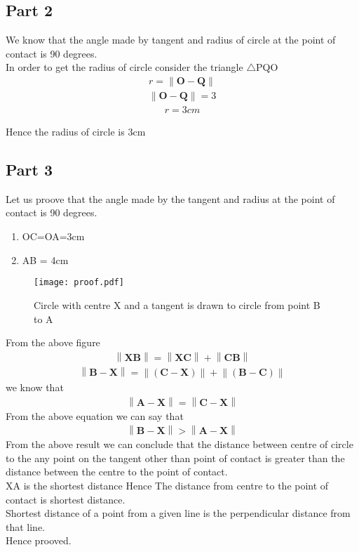 \documentclass[journal,10pt,twocolumn]{article}
\providecommand{\norm}[1]{\left\lVert#1\right\rVert}
\let\vec\mathbf
\begin{document}
\subsection*{Part 2}
We know that the angle made by tangent and radius of circle at the point of contact is 90 degrees. \\
In order to get the radius of circle consider the triangle $\triangle$PQO \\
\begin{align}
	r = \norm{\vec{O}-\vec{Q}}
\end{align}
\begin{align}
	\norm{\vec{O} - \vec{Q}}= 3
\end{align}
\begin{align}
  r= 3 cm 
\end{align}


Hence the radius of circle is 3cm

\subsection*{Part 3}
Let us proove that the angle made by the tangent and radius at the point of contact is 90  degrees. \\
\begin{enumerate}
	\item OC=OA=3cm
	\item AB = 4cm
\end{enumerate}
\begin{figure}[h]
\centering
\texttt{[image: proof.pdf]}
\caption{Circle with centre X and a tangent is drawn to circle from point B to A}
\label{fig:Circle}
\end{figure}
From the above figure 
\begin{align}
	\norm{\vec{XB}} = \norm{\vec{XC}} + \norm{\vec{CB}}
\end{align}
\begin{align}
	\norm{\vec{B-X}} = \norm{(\vec{C-X})} + \norm{(\vec{B-C})}
\end{align}
we know that \\
\begin{align}
	\norm{\vec{A-X}} = \norm{\vec{C-X}}
\end{align}
From the above equation we can say that 
\begin{align}
	\norm{\vec{B-X}} > \norm{\vec{A-X}}
\end{align}
From the above result we can conclude that the distance between centre of circle to the any point on the tangent other than point of contact is greater than the distance between the centre to the point of contact. \\
XA is the shortest distance
Hence The distance from centre to the point of contact is shortest distance.\\
Shortest distance of a point from a given line is the perpendicular distance from that line.\\
Hence prooved.
\end{document}
